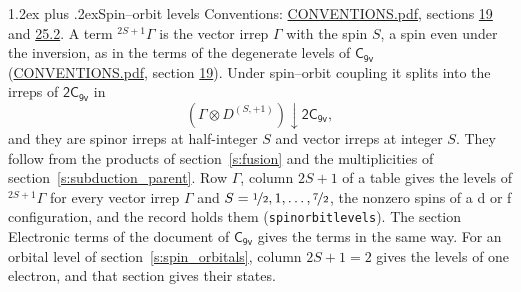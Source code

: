 \documentclass[10pt,a4paper]{article}
\makeatletter
\renewcommand\section{\@startsection{section}{1}{\z@}{-3ex plus -1ex minus -.2ex}%
  {1.2ex plus .2ex}{\normalfont\large\sffamily\bfseries\color{parttitle}}}
\numberwithin{equation}{section}
\newcommand{\grp}[1]{\mathsf{#1}}
\newcommand{\restr}[2]{#1\!\downarrow#2}
\newcommand{\irrJp}[2]{D^{(#1,#2)}}
\newcommand{\irrprod}{\otimes}
\newcommand{\term}[2]{{}^{#1}#2}
\makeatother
\begin{document}
\section{Spin--orbit levels}\label{s:spin_orbit}
Conventions: \href{../../CONVENTIONS.pdf}{CONVENTIONS.pdf}, sections \href{../../../rotation/CONVENTIONS.pdf\#conv.19}{19} and \href{../../CONVENTIONS.pdf\#conv.25.2}{25.2}.
\leavevmode\label{n:local.spin}\label{n:symbol.term}A term $\term{2S+1}{\Gamma}$ is the vector irrep $\Gamma$ with the spin $S$, a spin even under the inversion, as in the terms of the degenerate levels of \href{../../../rotation/data/pdf/C9v.pdf}{$\grp{C_{9v}}$} (\href{../../CONVENTIONS.pdf}{CONVENTIONS.pdf}, section \href{../../../rotation/CONVENTIONS.pdf\#conv.19}{19}). Under spin--orbit coupling it splits into the irreps of $\grp{2C_{9v}}$ in
\begin{equation}\label{e:spinorbit}\restr{(\Gamma \irrprod \irrJp{S}{+1})}{\grp{2C_{9v}}},\end{equation}
and they are spinor irreps at half-integer $S$ and vector irreps at integer $S$. They follow from the products of section~\ref{s:fusion} and the multiplicities of section~\ref{s:subduction_parent}. Row $\Gamma$, column $2S + 1$ of a table gives the levels of $\term{2S+1}{\Gamma}$ for every vector irrep $\Gamma$ and $S = \nicefrac{1}{2}, 1, \dots, \nicefrac{7}{2}$, the nonzero spins of a d or f configuration, and the record holds them (\texttt{spinorbitlevels}). The section Electronic terms of the document of \href{../../../rotation/data/pdf/C9v.pdf}{$\grp{C_{9v}}$} gives the terms in the same way. For an orbital level of section~\ref{s:spin_orbitals}, column $2S + 1 = 2$ gives the levels of one electron, and that section gives their states.
\end{document}

